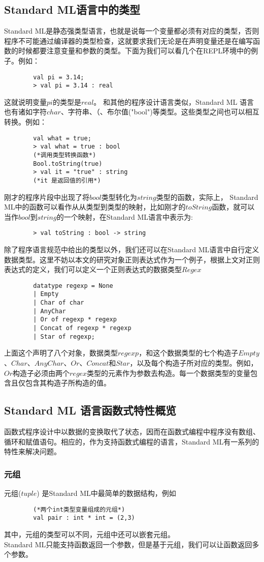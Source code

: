 \documentclass[openany,oneside]{book}
\theoremstyle{definition}
\theoremstyle{definition}
\begin{document}
\subsection{Standard ML语言中的类型}
	Standard ML是静态强类型语言，也就是说每一个变量都必须有对应的类型，否则程序不可能通过编译器的类型检查，这就要求我们无论是在声明变量还是在编写函数的时候都要注意变量和参数的类型。下面为我们可以看几个在REPL环境中的例子。例如：
	\begin{lstlisting}
		val pi = 3.14;
		> val pi = 3.14 : real
	\end{lstlisting}
	这就说明变量\(pi\)的类型是\(real\)。
	和其他的程序设计语言类似，Standard ML 语言也有诸如字符\(char\)、字符串、（、布尔值("bool")等类型。这些类型之间也可以相互转换。例如：
	\begin{lstlisting}
		val what = true;
		> val what = true : bool
		(*调用类型转换函数*)
		Bool.toString(true)
		> val it = "true" : string
		(*it 是返回值的引用*)
	\end{lstlisting}
	刚才的程序片段中出现了将\(bool\)类型转化为\(string\)类型的函数，实际上， Standard ML中的函数可以看作从从类型到类型的映射，比如刚才的\(toString\)函数，就可以当作\(bool\)到\(string\)的一个映射，在Standard ML语言中表示为:
	\begin{lstlisting}
		> val toString : bool -> string
	\end{lstlisting}
	除了程序语言规范中给出的类型以外，我们还可以在Standard ML语言中自行定义数据类型。\cite{paulson1996ml-124}这里不妨以本文的研究对象正则表达式作为一个例子，根据上文对正则表达式的定义，我们可以定义一个正则表达式的数据类型\(Regex\)
	\begin{lstlisting}
		datatype regexp = None
		| Empty
		| Char of char
		| AnyChar
		| Or of regexp * regexp
		| Concat of regexp * regexp
		| Star of regexp;
	\end{lstlisting}
	上面这个声明了八个对象，数据类型\(regexp\)，和这个数据类型的七个构造子\(Empty\)、\(Char\)、\(AnyChar\)、\(Or\)、\(Concat\)和\(Star\)，以及每个构造子所对应的类型。例如，\(Or\)构造子必须由两个\(regex\)类型的元素作为参数去构造。每一个数据类型的变量包含且仅包含其构造子所构造的值。
\subsection{Standard ML 语言函数式特性概览}
	函数式程序设计中以数据的变换取代了状态，因而在函数式编程中程序没有数组、循环和赋值语句。相应的，作为支持函数式编程的语言，Standard ML有一系列的特性来解决问题。\\
	\subsubsection{元组}
	\indent 元组(\(tuple\)) 是Standard ML中最简单的数据结构，例如
	\begin{lstlisting}
		(*两个int类型变量组成的元组*)
		val pair : int * int = (2,3)
	\end{lstlisting}
	其中，元组的类型可以不同，元组中还可以嵌套元组。\\
	\indent Standard ML只能支持函数返回一个参数，但是基于元组，我们可以让函数返回多个参数。
\end{document}

